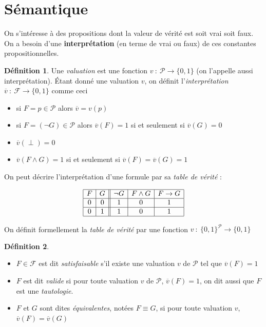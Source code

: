 \documentclass[]{article}
\theoremstyle{remark}
\theoremstyle{definition}
\newtheorem{mydef}{Définition}
\newcommand{\fun}[3]{
#1 ~ : ~ #2 \longrightarrow #3
}
\begin{document}
\section{Sémantique}

On s'intéresse à des propositions dont la valeur de vérité est soit vrai soit faux. On a besoin d'une \textbf{interprétation} (en terme de vrai ou faux) de ces constantes propositionnelles.

\begin{mydef}
	Une \textit{valuation} est une fonction $v ~ : ~ \mathcal{P} \longrightarrow \{0, 1\}$ (on l'appelle aussi interprétation).
	Étant donné une valuation $v$, on définit l'\textit{interprétation} $\fun{\overline{v}}{\mathcal{F}}{\{0, 1\}}$ comme ceci
	\begin{itemize}
		\item si $F = p \in \mathcal{P}$ alors $\overline{v}=v(p)$
		\item si $F = (\neg G) \in \mathcal{P}$ alors $\overline{v}(F) = 1$ si et seulement si $\overline{v}(G) = 0$
		\item $\overline{v}(\perp)=0$
		\item $\overline{v}(F \land G) = 1$ si et seulement si $\overline{v} (F) = \overline{v} (G) = 1$
	\end{itemize}
\end{mydef}

On peut décrire l'interprétation d'une formule par sa \textit{table de vérité} :

$$
	\begin{array}{|c|c||c|c|c|}
		\hline
		F & G & \neg G & F \land G & F \rightarrow G \\
		\hline
		0 & 0 & 1 & 0 & 1 \\
		\hline
		0 & 1 & 1 & 0 & 1 \\
		\hline
	\end{array}
$$

On définit formellement la \textit{table de vérité} par une fonction $\fun{v}{\{0, 1\}^\mathcal{P}}{\{0, 1\}}$

\begin{mydef}
	\leavevmode
	\begin{itemize}
		\item $F \in \mathcal{F}$ est dit \textit{satisfaisable} s'il existe une valuation $v$ de $\mathcal{P}$ tel que $\overline{v}(F)=1$
		\item $F$ est dit \textit{valide} si pour toute valuation $v$ de $\mathcal{P}$, $\overline{v}(F) = 1$, on dit aussi que $F$ est une \textit{tautologie}.
		\item $F$ et $G$ sont dites \textit{équivalentes}, notées $F \equiv G$, si pour toute valuation $v$, $\overline{v}(F)=\overline{v}(G)$
	\end{itemize}
\end{mydef}
\end{document}
